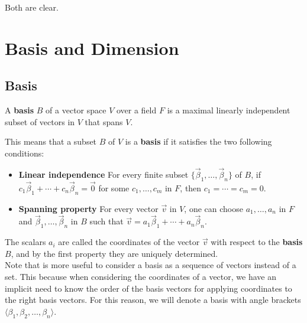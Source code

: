 \begin{tcolorbox}[colback=def_color,coltitle=black,coltext=black,colframe=pro_color_back,title=\textbf{Proof}] Both are clear.
\end{tcolorbox}
\section{Basis and Dimension}

\subsection{Basis}

\begin{tcolorbox}[colback=def_color,colframe=gray] \begin{definition}
    A \textbf{basis} $B$ of a vector space $V$ over a field $F$ is a maximal linearly independent subset of vectors in $V$ that spans $V$.
\end{definition}
\end{tcolorbox}

This means that a subset $B$ of $V$ is a \textbf{basis} if it satisfies the two following conditions:

\begin{itemize}
\item \textbf{Linear independence}
    For every finite subset $\{ \vec{\beta} _{1},\dotsc ,\vec {\beta}_{n}\}$ of $B$, if ${\displaystyle c_{1}\vec {\beta}_{1} + \cdots + c_{n}\vec {\beta}_{n}=\vec {0} }$ for some ${\displaystyle c_{1},\dotsc ,c_{m}}$ in $F$, then ${\displaystyle c_{1}=\cdots =c_{m}=0}$.
\item \textbf{Spanning property}
    For every vector $\vec{v}$ in $V$, one can choose ${\displaystyle a_{1},\dots, a_{n}}$ in $F$ and ${\displaystyle \vec {\beta}_{1},\dots  ,\vec {\beta}_{n}}$ in $B$ such that ${\displaystyle \vec {v} = a_{1}\vec {\beta}_{1} + \cdots + a_{n}\vec {\beta}_{n}}$.
\end{itemize}

The scalars $a_{i}$ are called the coordinates of the vector $\vec{v}$ with respect to the \textbf{basis} $B$, and by the first property they are uniquely determined.
\\

Note that is more useful to consider a basis as a sequence of vectors instead of a set. This because when considering the coordinates of a vector, we have an implicit need to know the order of the basis vectors for applying coordinates to the right basis vectors. For this reason, we will denote a basis with angle brackets $\langle \beta_1, \beta_2, \dots, \beta_n \rangle$.
\\

